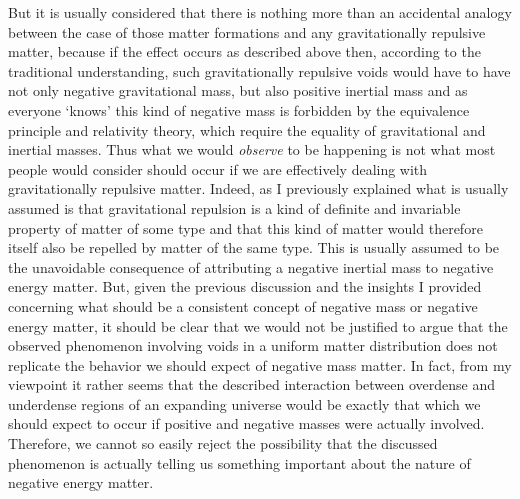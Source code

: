 \documentclass[notitlepage,12pt]{report}
\begin{document}
But it is usually considered that there is nothing more than an accidental analogy between the case of those matter formations and any gravitationally repulsive matter, because if the effect occurs as described above then, according to the traditional understanding, such gravitationally repulsive voids would have to have not only negative gravitational mass, but also positive inertial mass and as everyone `knows' this kind of negative mass is forbidden by the equivalence principle and relativity theory, which require the equality of gravitational and inertial masses. Thus what we would \textit{observe} to be happening is not what most people would consider should occur if we are effectively dealing with gravitationally repulsive matter. Indeed, as I previously explained what is usually assumed is that gravitational repulsion is a kind of definite and invariable property of matter of some type and that this kind of matter would therefore itself also be repelled by matter of the same type. This is usually assumed to be the unavoidable consequence of attributing a negative inertial mass to negative energy matter. But, given the previous discussion and the insights I provided concerning what should be a consistent concept of negative mass or negative energy matter, it should be clear that we would not be justified to argue that the observed phenomenon involving voids in a uniform matter distribution does not replicate the behavior we should expect of negative mass matter. In fact, from my viewpoint it rather seems that the described interaction between overdense and underdense regions of an expanding universe would be exactly that which we should expect to occur if positive and negative masses were actually involved. Therefore, we cannot so easily reject the possibility that the discussed phenomenon is actually telling us something important about the nature of negative energy matter.
\end{document}
